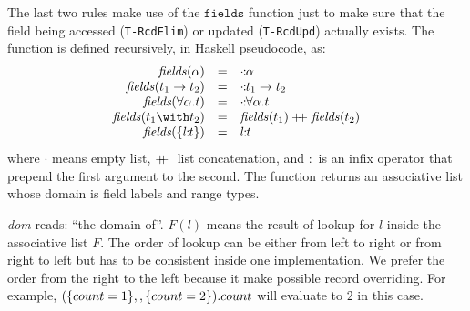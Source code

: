 The last two rules make use of the $ \texttt{fields} $ function just to make
sure that the field being accessed (\texttt{T-RcdElim}) or updated
(\texttt{T-RcdUpd}) actually exists. The function is defined recursively, in
Haskell pseudocode, as:
\[ \begin{array}{rll}
  \fields{\alpha} & = & \rel{\cdot}{\alpha} \\
  \fields{t_1 \to t_2} & = & \rel{\cdot}{t_1 \to t_2} \\
  \fields{\univquant{\alpha}{t}} & = & \rel{\cdot}{\univquant{\alpha}{t}} \\
  \fields{t_1 \with t_2} & = & \fields{t_1} \dplus \fields{t_2} \\
  \fields{\recordtype{l}{t}} & = & \rel{l}{t}
\end{array} \]
where $ \cdot $ means empty list, $ +\!\!\!+ \; $ list concatenation, and $ : $ is an
infix operator that prepend the first argument to the second. The function
returns an associative list whose domain is field labels and range types.

\textit{dom} reads: ``the domain of''. $ F(l) $ means the result of lookup for
$ l $ inside the associative list $ F $. The order of lookup can be either from
left to right or from right to left but has to be consistent inside one
implementation. We prefer the order from the right to the left because it make
possible record overriding. For example,
$ (\{ count = 1 \} ,, \{ count = 2 \}).count $ will evaluate to
$ 2 $ in this case.




